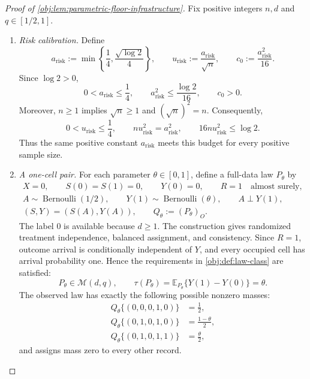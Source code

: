 \begin{proof}[Proof of \cref{obj:lem:parametric-floor-infrastructure}]
Fix positive integers \(n,d\) and \(q\in[1/2,1]\).

\begin{enumerate}
\item \emph{Risk calibration.}
Define
\[
a_{\mathrm{risk}}
:=
\min\left\{\frac14,\frac{\sqrt{\log 2}}4\right\},
\qquad
u_{\mathrm{risk}}
:=
\frac{a_{\mathrm{risk}}}{\sqrt n},
\qquad
c_0:=\frac{a_{\mathrm{risk}}^2}{16}.
\]
Since \(\log 2>0\),
\[
0<a_{\mathrm{risk}}\le\frac14,
\qquad
a_{\mathrm{risk}}^2\le\frac{\log 2}{16},
\qquad
c_0>0.
\]
Moreover, \(n\ge1\) implies \(\sqrt n\ge1\) and \((\sqrt n)^2=n\). Consequently,
\[
0<u_{\mathrm{risk}}\le\frac14,
\qquad
n u_{\mathrm{risk}}^2=a_{\mathrm{risk}}^2,
\qquad
16n u_{\mathrm{risk}}^2\le\log 2.
\]
Thus the same positive constant \(a_{\mathrm{risk}}\) meets this budget for every positive sample size.

\item \emph{A one-cell pair.}
For each parameter \(\theta\in[0,1]\), define a full-data law \(P_\theta\) by
\[
\begin{gathered}
X=0,\qquad S(0)=S(1)=0,\qquad Y(0)=0,\qquad R=1
\quad\text{almost surely},\\
A\sim\operatorname{Bernoulli}(1/2),\qquad
Y(1)\sim\operatorname{Bernoulli}(\theta),\qquad
A\perp Y(1),\\
(S,Y)=(S(A),Y(A)),
\qquad
Q_\theta:=(P_\theta)_O .
\end{gathered}
\]
The label \(0\) is available because \(d\ge1\). The construction gives randomized treatment independence, balanced assignment, and consistency. Since \(R=1\), outcome arrival is conditionally independent of \(Y\), and every occupied cell has arrival probability one. Hence the requirements in \cref{obj:def:law-class} are satisfied:
\[
P_\theta\in\mathcal M(d,q),
\qquad
\tau(P_\theta)
=\mathbb E_{P_\theta}\{Y(1)-Y(0)\}
=\theta.
\]
The observed law has exactly the following possible nonzero masses:
\[
\begin{aligned}
Q_\theta\{(0,0,0,1,0)\}&=\frac12,\\
Q_\theta\{(0,1,0,1,0)\}&=\frac{1-\theta}{2},\\
Q_\theta\{(0,1,0,1,1)\}&=\frac{\theta}{2},
\end{aligned}
\]
and assigns mass zero to every other record.


\end{enumerate}
\end{proof}
